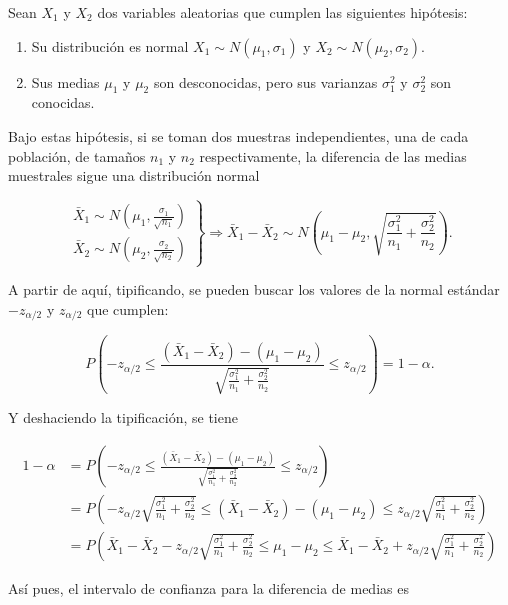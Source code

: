 \documentclass[
  a4paper,
]{scrreport}
\providecommand{\tightlist}{%
  \setlength{\itemsep}{0pt}\setlength{\parskip}{0pt}}\usepackage{longtable,booktabs,array}
\theoremstyle{definition}
\theoremstyle{definition}
\theoremstyle{plain}
\theoremstyle{remark}
\begin{document}
Sean \(X_1\) y \(X_2\) dos variables aleatorias que cumplen las
siguientes hipótesis:

\begin{enumerate}
\def\labelenumi{\arabic{enumi}.}
\tightlist
\item
  Su distribución es normal \(X_1\sim N(\mu_1,\sigma_1)\) y
  \(X_2\sim N(\mu_2,\sigma_2)\).
\item
  Sus medias \(\mu_1\) y \(\mu_2\) son desconocidas, pero sus varianzas
  \(\sigma^2_1\) y \(\sigma^2_2\) son conocidas.
\end{enumerate}

Bajo estas hipótesis, si se toman dos muestras independientes, una de
cada población, de tamaños \(n_1\) y \(n_2\) respectivamente, la
diferencia de las medias muestrales sigue una distribución normal

\[
\left.
\begin{array}{l}
\bar{X}_1\sim N\left(\mu_1,\frac{\sigma_1}{\sqrt{n_1}} \right)\\
\bar{X}_2\sim N\left(\mu_2,\frac{\sigma_2}{\sqrt{n_2}} \right)
\end{array}
\right\}
\Rightarrow
\bar{X}_1-\bar{X}_2 \sim N\left(\mu_1-\mu_2,\sqrt{\frac{\sigma^2_1}{n_1}+\frac{\sigma^2_2}{n_2}}\right).
\]

A partir de aquí, tipificando, se pueden buscar los valores de la normal
estándar \(-z_{\alpha/2}\) y \(z_{\alpha/2}\) que cumplen:

\[
P\left(-z_{\alpha/2}\leq \frac{(\bar{X}_1-\bar{X}_2)-(\mu_1-\mu_2)}{\sqrt{\frac{\sigma^2_1}{n_1}+\frac{\sigma^2_2}{n_2}}} \leq z_{\alpha/2}\right) = 1-\alpha.
\]

Y deshaciendo la tipificación, se tiene

\begin{align*}
1-\alpha 
&= P\left(-z_{\alpha/2}\leq \frac{(\bar{X}_1-\bar{X}_2)-(\mu_1-\mu_2)}{\sqrt{\frac{\sigma^2_1}{n_1}+\frac{\sigma^2_2}{n_2}}} \leq z_{\alpha/2}\right) \\
&= P\left(-z_{\alpha/2}\sqrt{\frac{\sigma^2_1}{n_1}+\frac{\sigma^2_2}{n_2}}\leq (\bar{X}_1-\bar{X}_2)-(\mu_1-\mu_2)\leq z_{\alpha/2}\sqrt{\frac{\sigma^2_1}{n_1}+\frac{\sigma^2_2}{n_2}}\right) \\
&= P\left(\bar{X}_1-\bar{X}_2 - z_{\alpha/2}\sqrt{\frac{\sigma^2_1}{n_1}+\frac{\sigma^2_2}{n_2}}\leq \mu_1-\mu_2\leq \bar{X}_1-\bar{X}_2 + z_{\alpha/2}\sqrt{\frac{\sigma^2_1}{n_1}+\frac{\sigma^2_2}{n_2}}\right)
\end{align*}

Así pues, el intervalo de confianza para la diferencia de medias es
\end{document}
